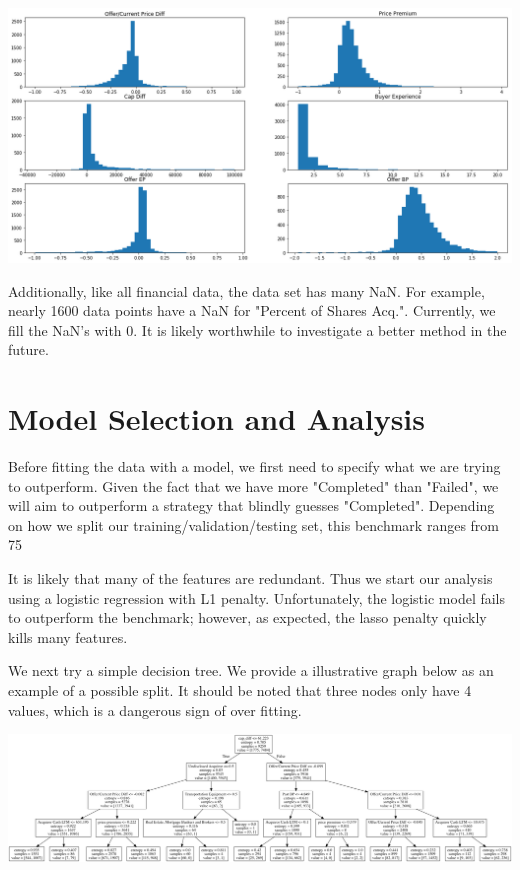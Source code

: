 \documentclass[a4paper]{article}
\begin{document}
\begin{center}
\includegraphics[scale=0.3]{hist.png} 
\end{center}

Additionally, like all financial data, the data set has many NaN. For example, nearly 1600 data points have a NaN for "Percent of Shares Acq.". Currently, we fill the NaN's with 0. It is likely worthwhile to investigate a better method in the future.


\section{Model Selection and Analysis }
\label{sec:model}

Before fitting the data with a model, we first need to specify what we are trying to outperform. Given the fact that we have more "Completed" than "Failed", we will aim to outperform a strategy that blindly guesses "Completed". Depending on how we split our training/validation/testing set, this benchmark ranges from 75%

It is likely that many of the features are redundant. Thus we start our analysis using a logistic regression with L1 penalty. Unfortunately, the logistic model fails to outperform the benchmark; however, as expected, the lasso penalty quickly kills many features.

We next try a simple decision tree. We provide a illustrative graph below as an example of a possible split. It should be noted that three nodes only have 4 values, which is a dangerous sign of over fitting. 

\begin{center}
\includegraphics[scale=0.15]{tree.png} 

\end{center}
\end{document}
